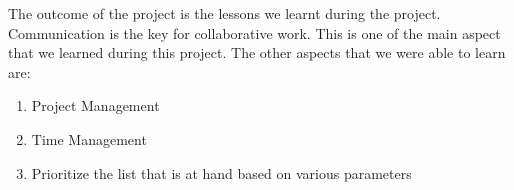 The outcome of the project is the lessons we learnt during the project. Communication is the key for collaborative work. This is one of the main aspect that we learned during this project. The other aspects that we were able to learn are:
\begin{enumerate}
\item Project Management
\item Time Management
\item Prioritize the list that is at hand based on various parameters
\end{enumerate}